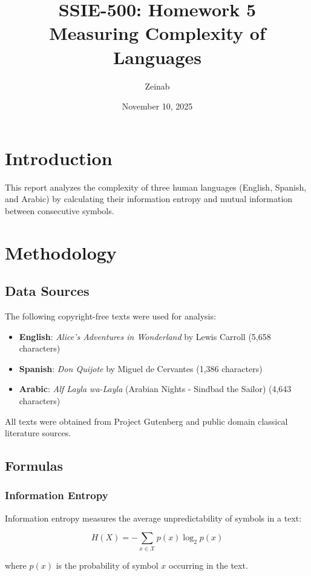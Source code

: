 \documentclass[12pt]{article}
\title{SSIE-500: Homework 5\\
Measuring Complexity of Languages}
\author{Zeinab}
\date{November 10, 2025}
\begin{document}
\maketitle

\section{Introduction}
This report analyzes the complexity of three human languages (English, Spanish, and Arabic) by calculating their information entropy and mutual information between consecutive symbols.

\section{Methodology}

\subsection{Data Sources}
The following copyright-free texts were used for analysis:
\begin{itemize}
    \item \textbf{English}: \textit{Alice's Adventures in Wonderland} by Lewis Carroll (5,658 characters)
    \item \textbf{Spanish}: \textit{Don Quijote} by Miguel de Cervantes (1,386 characters)
    \item \textbf{Arabic}: \textit{Alf Layla wa-Layla} (Arabian Nights - Sindbad the Sailor) (4,643 characters)
\end{itemize}

All texts were obtained from Project Gutenberg and public domain classical literature sources.

\subsection{Formulas}

\subsubsection{Information Entropy}
Information entropy measures the average unpredictability of symbols in a text:

\begin{equation}
H(X) = -\sum_{x \in \mathcal{X}} p(x) \log_2 p(x)
\end{equation}

where $p(x)$ is the probability of symbol $x$ occurring in the text.
\end{document}
